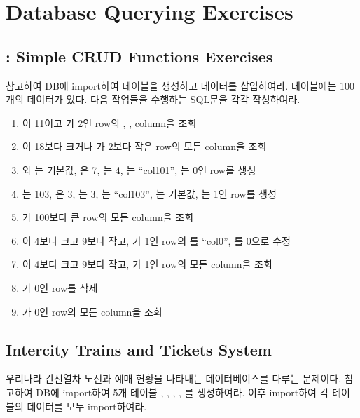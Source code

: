 \section{Database Querying Exercises}\label{sect:database-querying-exercises}

\subsection*{: Simple CRUD Functions Exercises}

\을 참고하여 DB에 \을 import하여 테이블을 생성하고 데이터를 삽입하여라.  테이블에는 100개의 데이터가 있다. 다음 작업들을 수행하는 SQL문을 각각 작성하여라.

\begin{enumerate}
    \item {}이 11이고 가 2인 row의 , ,  column을 조회
    \item {}이 18보다 크거나 가 2보다 작은 row의 모든 column을 조회
    \item {}와 는 기본값, 은 7, 는 4, 는 ``col101'', 는 0인 row를 생성
    \item {}는 103, 은 3, 는 3, 는 ``col103'', 는 기본값, 는 1인 row를 생성
    \item {}가 100보다 큰 row의 모든 column을 조회
    \item {}이 4보다 크고 9보다 작고, 가 1인 row의 를 ``col0'', 를 0으로 수정
    \item {}이 4보다 크고 9보다 작고, 가 1인 row의 모든 column을 조회
    \item {}가 0인 row를 삭제
    \item {}가 0인 row의 모든 column을 조회
\end{enumerate}

\subsection*{Intercity Trains and Tickets System}

\과 \는 우리나라 간선열차 노선과 예매 현황을 나타내는 데이터베이스를 다루는 문제이다. \을 참고하여 DB에 \를 import하여 5개 테이블 , , , , 를 생성하여라. 이후 \를 import하여 각 테이블의 데이터를 모두 import하여라.

